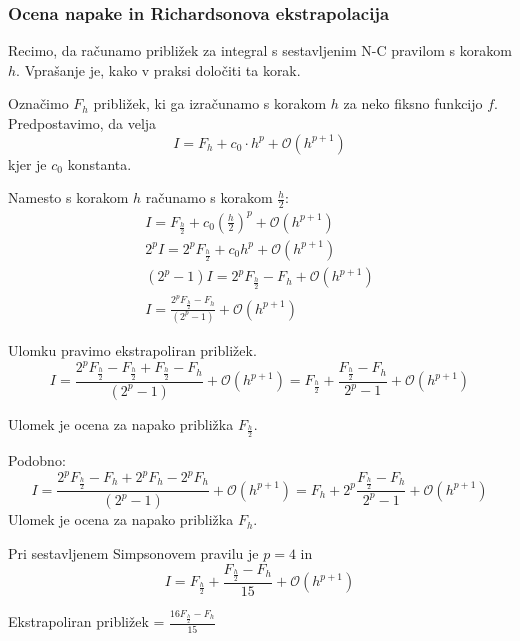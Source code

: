 \documentclass[a4paper,12pt]{article}
\theoremstyle{definition}
\theoremstyle{remark}
\begin{document}
\subsubsection{Ocena napake in Richardsonova ekstrapolacija}

Recimo, da računamo približek za integral s sestavljenim N-C pravilom s korakom $h$. Vprašanje je, kako v praksi določiti ta korak.

Označimo $F_h$ približek, ki ga izračunamo s korakom $h$ za neko fiksno funkcijo $f$. Predpostavimo, da velja
\begin{equation*}
    I = F_h + c_0 \cdot h^p + \mathscr{O} (h^{p+1})
\end{equation*}
kjer je $c_0$ konstanta.

Namesto s korakom $h$ računamo s korakom $\frac{h}{2}$:
\begin{gather*}
    I = F_{\frac{h}{2}} + c_0 (\frac{h}{2})^p + \mathscr{O} (h^{p+1}) \\
    2^p I = 2^p F_{\frac{h}{2}} + c_0 h^p  + \mathscr{O} (h^{p+1}) \\
    (2^p - 1) I = 2^p F_{\frac{h}{2}} - F_h + \mathscr{O} (h^{p+1}) \\
    I = \frac{2^p F_{\frac{h}{2}} - F_h}{(2^p - 1)} + \mathscr{O} (h^{p+1})
\end{gather*}

Ulomku pravimo ekstrapoliran približek.
\begin{equation*}
    I = \frac{2^p F_{\frac{h}{2}} - F_{\frac{h}{2}} + F_{\frac{h}{2}} -  F_h}{(2^p - 1)} + \mathscr{O} (h^{p+1})
    = F_{\frac{h}{2}} + \frac{F_{\frac{h}{2}} - F_h}{2^p - 1}+ \mathscr{O} (h^{p+1})
\end{equation*}

Ulomek je ocena za napako približka $F_{\frac{h}{2}}$.

Podobno:
\begin{equation*}
    I = \frac{2^p F_{\frac{h}{2}} - F_h + 2^p F_h - 2^p F_h}{(2^p - 1)} + \mathscr{O} (h^{p+1})
    = F_h + 2^p \frac{F_{\frac{h}{2}} - F_h}{2^p - 1} + \mathscr{O} (h^{p+1})
\end{equation*}
Ulomek je ocena za napako približka $F_h$.

Pri sestavljenem Simpsonovem pravilu je $p = 4$ in
\begin{equation*}
    I = F_{\frac{h}{2}} + \frac{F_{\frac{h}{2}} - F_h}{15} + \mathscr{O} (h^{p+1})
\end{equation*}

Ekstrapoliran približek = $\frac{16 F_{\frac{h}{2}} - F_h}{15}$
\end{document}
